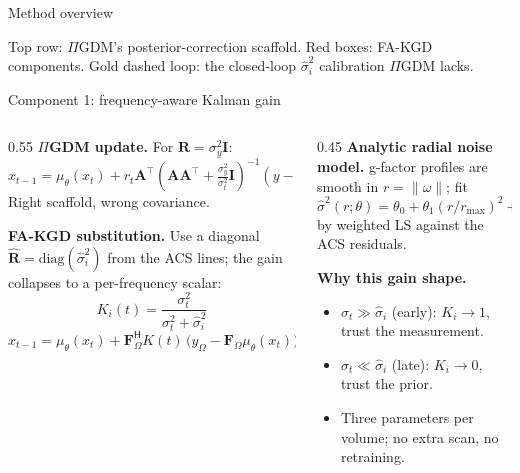 \documentclass[aspectratio=169]{beamer}
\newcommand{\PIGDM}{$\Pi$GDM}
\newcommand{\FAKGD}{FA-KGD}
\newcommand{\hatR}{\hat{\mathbf{R}}}
\newcommand{\hatsig}{\hat{\sigma}}
\newcommand{\muth}{\mu_\theta}
\begin{document}
\begin{frame}{Method overview}
\begin{center}
  \end{center}
  \vspace{0.2em}
  \footnotesize
  Top row: \PIGDM{}'s posterior-correction scaffold. Red boxes: \FAKGD{} components. Gold dashed loop: the closed-loop $\hatsig_i^2$ calibration \PIGDM{} lacks.
\end{frame}

\begin{frame}{Component 1: frequency-aware Kalman gain}
  \small
  \begin{columns}[T]
    \begin{column}{0.55\textwidth}
      \textbf{\PIGDM{} update.} For $\mathbf{R}=\sigma_y^2 \mathbf{I}$:
      \[
        \hat{x}_{t-1} = \muth(x_t) + r_t \mathbf{A}^\top
        \!\left(\mathbf{A}\mathbf{A}^\top + \tfrac{\sigma_y^2}{\sigma_t^2}\mathbf{I}\right)^{-1}\!\!(y-\mathbf{A}\muth(x_t)).
      \]
      Right scaffold, wrong covariance.

      \vspace{0.4em}
      \textbf{\FAKGD{} substitution.} Use a diagonal $\hatR=\mathrm{diag}(\hatsig_i^2)$ from the ACS lines; the gain collapses to a per-frequency scalar:
      \[
        \boxed{K_i(t) = \frac{\sigma_t^2}{\sigma_t^2 + \hatsig_i^2}}
      \]
      \[
        \hat{x}_{t-1} = \muth(x_t) + \mathbf{F}_\Omega^\mathsf{H} K(t)\,\bigl(y_\Omega - \mathbf{F}_\Omega\muth(x_t)\bigr).
      \]
    \end{column}
    \begin{column}{0.45\textwidth}
      \textbf{Analytic radial noise model.} g-factor profiles are smooth in $r=\|\omega\|$; fit
      \[
        \hatsig^2(r;\theta) = \theta_0 + \theta_1 (r/r_{\max})^2 + \theta_2 (r/r_{\max})^4
      \]
      by weighted LS against the ACS residuals.

      \vspace{0.4em}
      \textbf{Why this gain shape.}
      \begin{itemize}
        \item $\sigma_t \gg \hatsig_i$ (early): $K_i \!\to\! 1$, trust the measurement.
        \item $\sigma_t \ll \hatsig_i$ (late): $K_i \!\to\! 0$, trust the prior.
        \item Three parameters per volume; no extra scan, no retraining.
      \end{itemize}
    \end{column}
  \end{columns}
\end{frame}
\end{document}
